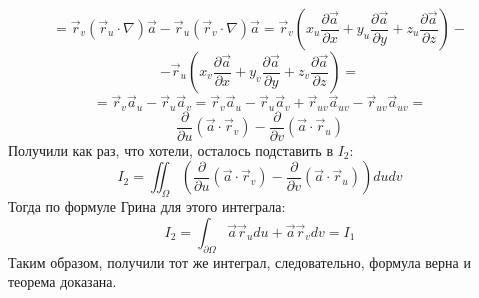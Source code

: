 \documentclass[12pt]{article}
\begin{document}
$$= \overrightarrow{r}_v (\overrightarrow{r}_u \cdot \nabla) \overrightarrow{a} - \overrightarrow{r}_u (\overrightarrow{r}_v \cdot \nabla) \overrightarrow{a} = \overrightarrow{r}_v (x_u \frac{\partial \overrightarrow{a}}{\partial x} + y_u \frac{\partial \overrightarrow{a}}{\partial y} + z_u \frac{\partial \overrightarrow{a}}{\partial z}) -$$
$$- \overrightarrow{r}_u (x_v \frac{\partial \overrightarrow{a}}{\partial x} + y_v \frac{\partial \overrightarrow{a}}{\partial y} + z_v \frac{\partial \overrightarrow{a}}{\partial z}) =$$
$$= \overrightarrow{r}_v \overrightarrow{a}_u - \overrightarrow{r}_u \overrightarrow{a}_v = \overrightarrow{r}_v \overrightarrow{a}_u - \overrightarrow{r}_u \overrightarrow{a}_v + \overrightarrow{r}_{uv} \overrightarrow{a}_{uv} - \overrightarrow{r}_{uv} \overrightarrow{a}_{uv} =$$
$$ \frac{\partial}{\partial u}(\overrightarrow{a} \cdot \overrightarrow{r}_v) - \frac{\partial}{\partial v} (\overrightarrow{a} \cdot \overrightarrow{r}_u)$$
Получили как раз, что хотели, осталось подставить в $I_2$:
$$I_2 = \iint_{\Omega} (\frac{\partial}{\partial u}(\overrightarrow{a} \cdot \overrightarrow{r}_v) - \frac{\partial}{\partial v} (\overrightarrow{a} \cdot \overrightarrow{r}_u)) du dv$$
Тогда по формуле Грина для этого интеграла:
$$I_2 = \int_{\partial \Omega} \overrightarrow{a} \overrightarrow{r}_u du + \overrightarrow{a} \overrightarrow{r}_v dv = I_1$$
Таким образом, получили тот же интеграл, следовательно, формула верна и теорема доказана.\par
\end{document}
